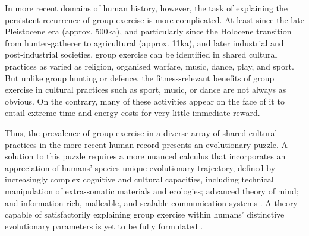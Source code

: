 \begin{CJK}{UTF8}{gbsn}
In more recent domains of human history, however, the task of explaining the persistent recurrence of group exercise is more complicated.  At least since the late Pleistocene era (approx. 500ka), and particularly since the Holocene transition from hunter-gatherer to agricultural (approx. 11ka), and later industrial and post-industrial societies, group exercise can be identified in shared cultural practices as varied as religion, organised warfare, music, dance, play, and sport.  But unlike group hunting or defence, the fitness-relevant benefits of group exercise in cultural practices such as sport, music, or dance are not always as obvious.  On the contrary, many of these activities appear on the face of it to entail extreme time and energy costs for very little immediate reward.

Thus, the prevalence of group exercise in a diverse array of shared cultural practices in the more recent human record presents an evolutionary puzzle.  A solution to this puzzle requires a more nuanced calculus that incorporates an appreciation of humans' species-unique evolutionary trajectory, defined by increasingly complex cognitive and cultural capacities, including technical manipulation of extra-somatic materials and ecologies; advanced theory of mind; and information-rich, malleable, and scalable communication systems \citep{Roepstorff2010,Clark2015,Fuentes2016}.  A theory capable of satisfactorily explaining group exercise within humans' distinctive evolutionary parameters is yet to be fully formulated \citep{Cohen2017}.


\end{CJK}
